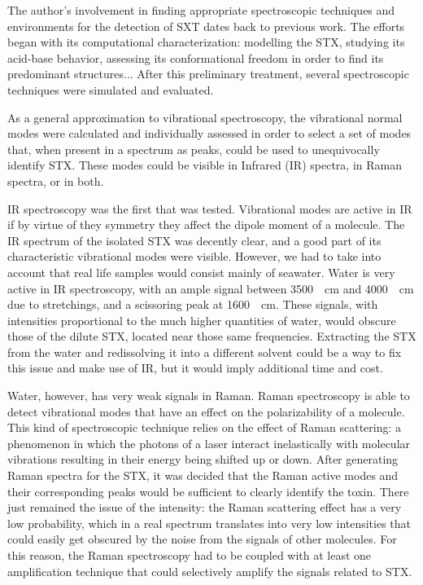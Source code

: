 The author's involvement in finding appropriate spectroscopic techniques and environments for the detection of SXT dates back to previous work.
The efforts began with its computational characterization: modelling the STX, studying its acid-base behavior, assessing its conformational freedom in order to find its predominant structures...
After this preliminary treatment, several spectroscopic techniques were simulated and evaluated.

As a general approximation to vibrational spectroscopy, the vibrational normal modes were calculated and individually assessed in order to select a set of modes that, when present in a spectrum as peaks, could be used to unequivocally identify STX.
These modes could be visible in Infrared (IR) spectra, in Raman spectra, or in both.

IR spectroscopy was the first that was tested.
Vibrational modes are active in IR if by virtue of they symmetry they affect the dipole moment of a molecule.
The IR spectrum of the isolated STX was decently clear, and a good part of its characteristic vibrational modes were visible.
However, we had to take into account that real life samples would consist mainly of seawater.
Water is very active in IR spectroscopy, with an ample signal between \SI{3500}{\per\cm} and \SI{4000}{\per\cm} due to stretchings, and a scissoring peak at \SI{1600}{\per\cm}.
These signals, with intensities proportional to the much higher quantities of water, would obscure those of the dilute STX, located near those same frequencies.
Extracting the STX from the water and redissolving it into a different solvent could be a way to fix this issue and make use of IR, but it would imply additional time and cost.

Water, however, has very weak signals in Raman.
Raman spectroscopy is able to detect vibrational modes that have an effect on the polarizability of a molecule.
This kind of spectroscopic technique relies on the effect of Raman scattering: a phenomenon in which the photons of a laser interact inelastically with molecular vibrations resulting in their energy being shifted up or down.
After generating Raman spectra for the STX, it was decided that the Raman active modes and their corresponding peaks would be sufficient to clearly identify the toxin.
There just remained the issue of the intensity: the Raman scattering effect has a very low probability, which in a real spectrum translates into very low intensities that could easily get obscured by the noise from the signals of other molecules.
For this reason, the Raman spectroscopy had to be coupled with at least one amplification technique that could selectively amplify the signals related to STX.

